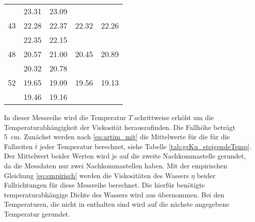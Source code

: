 \begin{table}[H]
\begin{tabular}{S[table-format=2.0] S[table-format=2.2] S  S  S }
               & 23.31 &  23.09 &           &           \\
            43 & 22.28 &  22.37 &   22.32   &  22.26    \\
               & 22.35 &  22.15 &           &           \\
            48 & 20.57 &  21.00 &   20.45   &  20.89    \\
               & 20.32 &  20.78 &           &           \\
            52 & 19.65 &  19.09 &   19.56   &  19.13    \\
               & 19.46 &  19.16 &           &           \\
        \bottomrule  
    \end{tabular}
\end{table}
In dieser Messreihe wird die Temperatur $T$ schrittweise erhöht um die Temperaturabhängigkeit der Viskosität herauszufinden.
Die Fallhöhe beträgt \qty[]{5}{\cm}.
Zunächst werden nach \eqref{eq:artim_mit} die Mittelwerte für die für die Fallzeiten $\overline{t}$ jeder Temperatur berechnet,
siehe Tabelle \ref{tab:grKu_steigendeTemp}.
Der Mittelwert beider Werten wird je auf die zweite Nachkommastelle gerundet,
da die Messdaten nur zwei Nachkommastellen haben.
Mit der empirischen Gleichung \eqref{eq:empirisch} werden die Viskositäten des Wassers $\eta$ beider Fallrichtungen für diese Messreihe berechnet.
Die hierfür benötigte temperaturabhängige Dichte des Wassers wird aus \cite[][290]{geschke} übernommen. 
Bei den Temperaturen, die nicht in \cite[][290]{geschke} enthalten sind wird auf die nächste angegebene Temperatur gerundet.
%
